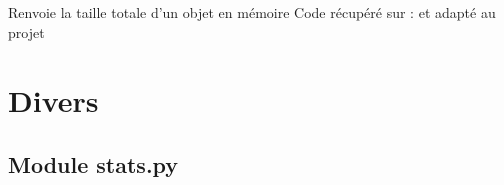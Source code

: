\documentclass[letterpaper,10pt,french]{sphinxmanual}
\begin{document}
\begin{fulllineitems}
\label{\detokenize{index:qRL_optimizer.random}}\pysiglinewithargsret{\sphinxcode{qRL\_optimizer.}\sphinxbfcode{random}}{}{{ $\rightarrow$ x in the interval {[}0, 1).}}
\end{fulllineitems}


\begin{fulllineitems}
\label{\detokenize{index:qRL_optimizer.total_size}}
Renvoie la taille totale d’un objet en mémoire
Code récupéré sur :  
et adapté au projet

\end{fulllineitems}



\chapter{Divers}
\label{\detokenize{index:divers}}

\section{Module stats.py}
\label{\detokenize{index:module-stats-py}}\label{\detokenize{index:module-stats}}
\end{document}
